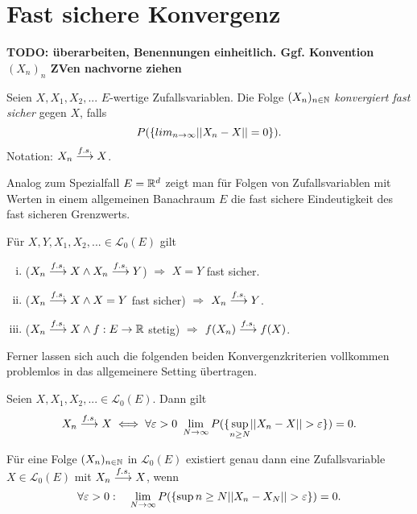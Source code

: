 \section{Fast sichere Konvergenz}
\textbf{TODO: überarbeiten, Benennungen einheitlich. Ggf. Konvention $(X_n)_n$  ZVen nachvorne ziehen}
\begin{mydef}
    Seien $X, X_1, X_2,...$ $E$-wertige Zufallsvariablen. Die Folge $(X_n)_{n \in \mathbb{N}}$ \textit{konvergiert fast sicher} gegen $X$, falls
    $$
        P(\{ lim_{n \to \infty} \lvert \lvert X_n - X \rvert \rvert = 0 \}).
    $$
Notation: $X_n \overset{f.s.}{\longrightarrow} X$. 
\end{mydef}

Analog zum Spezialfall $E = \mathbb{R}^d$ zeigt man für Folgen von Zufallsvariablen mit Werten in einem allgemeinen Banachraum $E$ die fast sichere Eindeutigkeit des fast sicheren Grenzwerts. 
\begin{proposition}
    Für $X,Y,X_1,X_2,... \in \mathcal{L}_0(E)$ gilt 
    \begin{enumerate}[(i)]
        \item ($X_n \overset{f.s.}{\longrightarrow} X \land X_n \overset{f.s.}{\longrightarrow} Y$) $\Rightarrow$ $ X = Y$ fast sicher. 
        \item ($X_n \overset{f.s.}{\longrightarrow} X \land X = Y$ fast sicher) $\Rightarrow$ $X_n \overset{f.s.}{\longrightarrow} Y$. 
        \item ($X_n \overset{f.s.}{\longrightarrow} X \land f:E \to \mathbb{R}$ stetig) $\Rightarrow$ $f(X_n) \overset{f.s.}{\longrightarrow} f(X)$. 
    \end{enumerate}
\end{proposition}

Ferner lassen sich auch die folgenden beiden Konvergenzkriterien vollkommen problemlos in das allgemeinere Setting übertragen. 

\begin{theorem}
    Seien $X, X_1,X_2,... \in \mathcal{L}_0(E)$. Dann gilt
    \begin{align*}
        X_n \overset{f.s.}{\longrightarrow} X \iff \forall \varepsilon > 0 \ \lim_{N \to \infty}P(\{\sup_{n \geq N}\lvert \lvert X_n - X \rvert \rvert > \varepsilon \}) = 0.
    \end{align*}
\end{theorem}

\begin{theorem}
    Für eine Folge $(X_n)_{n \in \mathbb{N}}$ in $\mathcal{L}_0(E)$ existiert genau dann eine Zufallsvariable $X \in \mathcal{L}_0(E)$ mit $X_n \overset{f.s.}{\longrightarrow} X$, wenn
    $$
        \forall \varepsilon > 0 : \quad \lim_{N \to \infty}P(\{\sup{n\geq N}\lvert \lvert X_n - X_N \rvert \rvert > \varepsilon \}) = 0. 
    $$
\end{theorem}

